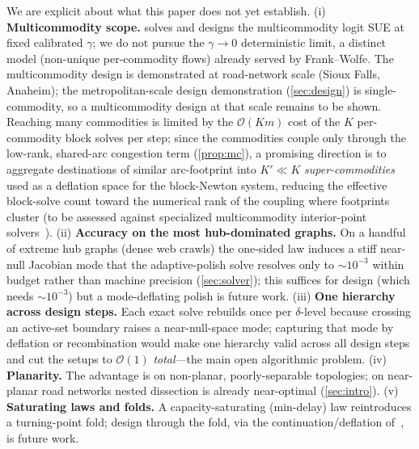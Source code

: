 \documentclass[ijoc]{informs3}
\begin{document}
We are explicit about what this paper does not yet establish. (i) \textbf{Multicommodity scope.}
 solves and designs the multicommodity logit SUE at fixed calibrated $\gamma$; we do not pursue the
$\gamma\to0$ deterministic limit, a distinct model (non-unique per-commodity flows) already served by
Frank--Wolfe. The multicommodity design is demonstrated at road-network scale (Sioux Falls, Anaheim); the
metropolitan-scale design demonstration (\cref{sec:design}) is single-commodity, so a multicommodity design at
that scale remains to be shown. Reaching many commodities is limited by the $\mathcal{O}(Km)$ cost of the $K$
per-commodity block solves per step; since the commodities couple only through the low-rank, shared-arc
congestion term (\cref{prop:mc}), a promising direction is to aggregate destinations of similar arc-footprint
into $K'\ll K$ \emph{super-commodities} used as a deflation space for the block-Newton system, reducing the
effective block-solve count toward the numerical rank of the coupling where footprints cluster (to be assessed
against specialized multicommodity interior-point solvers~\citep{castro2000}). (ii) \textbf{Accuracy on the most hub-dominated graphs.} On a handful of extreme hub graphs (dense web crawls)
the one-sided law induces a stiff near-null Jacobian mode that the adaptive-polish solve resolves only to
$\sim10^{-3}$ within budget rather than machine precision (\cref{sec:solver}); this suffices for design (which
needs $\sim10^{-3}$) but a mode-deflating polish is future work. (iii) \textbf{One hierarchy across design steps.} Each exact
solve rebuilds once per $\delta$-level because crossing an active-set boundary raises a near-null-space mode;
capturing that mode by deflation or recombination would make one hierarchy valid across all design steps and cut
the setups to $\mathcal{O}(1)$ \emph{total}---the main open algorithmic problem. (iv) \textbf{Planarity.} The
advantage is on non-planar, poorly-separable topologies; on near-planar road networks nested dissection is
already near-optimal (\cref{sec:intro}). (v) \textbf{Saturating laws and folds.} A capacity-saturating
(min-delay) law reintroduces a turning-point fold; design through the fold, via the continuation/deflation
of~\citet{nlf}, is future work.
\end{document}
